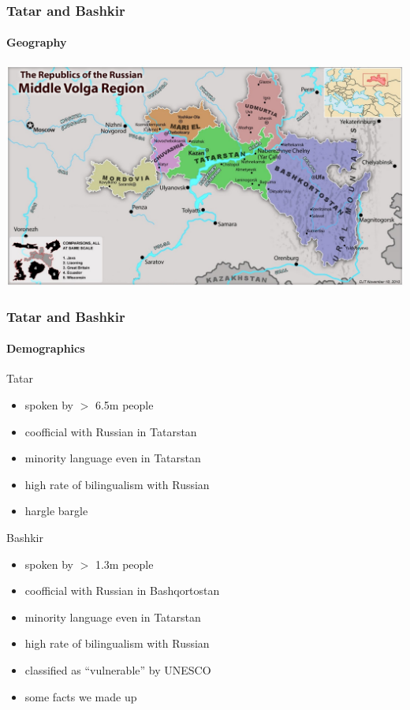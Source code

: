 \documentclass[10pt,xetex]{beamer} %
\begin{document}
\begin{frame}
  \frametitle{Tatar and Bashkir} %
  \framesubtitle{Geography}
		\vspace{0.2em}
		\noindent\hspace{-2.75em}\includegraphics[width=1.175\textwidth]{middlevolga19001500.jpg}
\end{frame}
\begin{frame}
	\frametitle{Tatar and Bashkir}
	\framesubtitle{Demographics}
    
    \begin{block}{Tatar}
      
      \begin{itemize}
        \item spoken by $>$ 6.5m people \citep{lewis2009}
		  \item coofficial with Russian in Tatarstan
		  \item minority language even in Tatarstan
		  \item high rate of bilingualism with Russian
        \item hargle bargle %
      \end{itemize}
      
    \end{block}
      
    \begin{block}{Bashkir}
      
      \begin{itemize}
        \item spoken by $>$ 1.3m people \citep{lewis2009}
		  \item coofficial with Russian in Bashqortostan
		  \item minority language even in Tatarstan
		  \item high rate of bilingualism with Russian
		  \item classified as ``vulnerable'' by UNESCO
        \item some facts we made up %
      \end{itemize}
    
    \end{block}
\end{frame}
\end{document}
